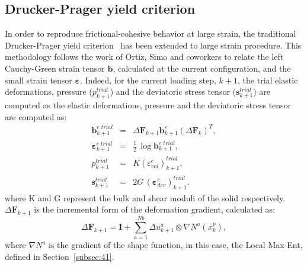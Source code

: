 \documentclass[twocolumn]{svjour3}          %
\begin{document}
\subsection{Drucker-Prager yield criterion}
\label{subsec:32}
In order to reproduce frictional-cohesive behavior at large strain, the traditional Drucker-Prager yield criterion~\cite{Sanavia:02,Sanavia:06} has been extended to large strain procedure. This methodology follows the work of Ortiz, Simo and coworkers \cite{cuitino:92,Ortiz1985,Simo2004} to relate the left Cauchy-Green strain tensor $\mathbf{b}$, calculated at the current configuration, and the small strain tensor $\boldsymbol{\varepsilon}$. Indeed, for the current loading step, $k+1$, 
the trial elastic deformations, pressure ($p^{trial}_{k+1}$)  and the deviatoric stress tensor ($\mathbf{s}^{trial}_{k+1} $) are computed as the elastic deformations, pressure  and the deviatoric stress tensor are computed as:
\begin{eqnarray}
\label{eq_dp1}
\mathbf{b}^{e\;trial}_{k+1} &=& \Delta\mathbf{F}_{k+1}\mathbf{b}^e_{k+1}(\Delta\mathbf{F}_{k})^{T}, \\
 \label{eq_dp2}
\boldsymbol{\varepsilon}^{e\; trial}_{k+1} &=& \frac{1}{2}\,\log\mathbf{b}^{e\; trial}_{k+1},
\\ \label{eq_dp3}
p^{trial}_{k+1} &=& K \left(\varepsilon^{e}_{vol}\right)^{trial}_{k+1},
\\ \label{eq_dp4}
\mathbf{s}^{trial}_{k+1} &=& 2G\,\left(\boldsymbol{\varepsilon}^{e}_{dev}\right)^{trial}_{k+1}.
\end{eqnarray}
where K and G represent the bulk and shear moduli of the solid respectively. $\Delta \mathbf{F}_{k+1} $ is the incremental form of the deformation gradient, calculated as:
\begin{equation}
\Delta \mathbf{F}_{k+1} = \mathbf{I}+\sum_{a=1}^{Nb}\Delta u_{k+1}^a \otimes \nabla N^a(x_{k}^p),
\end{equation}
where $\nabla N^a$ is the gradient of the shape function, in this case, the Local Max-Ent, defined in Section~\ref{subsec:41}.
\end{document}
